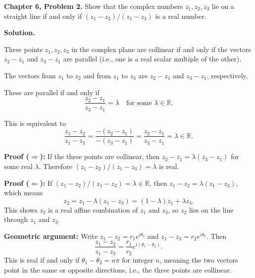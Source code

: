 \documentclass[12pt]{article}
\begin{document}
\textbf{Chapter 6, Problem 2.} Show that the complex numbers $z_1, z_2, z_3$ lie on a straight line if and only if $(z_1 - z_2)/(z_1 - z_3)$ is a real number.

\bigskip
\textbf{Solution.}

Three points $z_1, z_2, z_3$ in the complex plane are collinear if and only if the vectors $z_2 - z_1$ and $z_3 - z_1$ are parallel (i.e., one is a real scalar multiple of the other).

The vectors from $z_1$ to $z_2$ and from $z_1$ to $z_3$ are $z_2 - z_1$ and $z_3 - z_1$, respectively.

These are parallel if and only if
\[
\frac{z_2 - z_1}{z_3 - z_1} = \lambda \quad \text{for some } \lambda \in \mathbb{R}.
\]

This is equivalent to
\[
\frac{z_1 - z_2}{z_1 - z_3} = \frac{-(z_2-z_1)}{-(z_3-z_1)} = \frac{z_2-z_1}{z_3-z_1} = \lambda \in \mathbb{R}.
\]

\textbf{Proof ($\Rightarrow$):} If the three points are collinear, then $z_2 - z_1 = \lambda(z_3 - z_1)$ for some real $\lambda$. Therefore $(z_1 - z_2)/(z_1 - z_3) = \lambda$ is real.

\textbf{Proof ($\Leftarrow$):} If $(z_1-z_2)/(z_1-z_3) = \lambda \in \mathbb{R}$, then $z_1 - z_2 = \lambda(z_1-z_3)$, which means
\[
z_2 = z_1 - \lambda(z_1 - z_3) = (1-\lambda)z_1 + \lambda z_3.
\]
This shows $z_2$ is a real affine combination of $z_1$ and $z_3$, so $z_2$ lies on the line through $z_1$ and $z_3$.

\textbf{Geometric argument:} Write $z_1 - z_2 = r_1 e^{i\theta_1}$ and $z_1 - z_3 = r_2 e^{i\theta_2}$. Then
\[
\frac{z_1-z_2}{z_1-z_3} = \frac{r_1}{r_2} e^{i(\theta_1-\theta_2)}.
\]
This is real if and only if $\theta_1 - \theta_2 = n\pi$ for integer $n$, meaning the two vectors point in the same or opposite directions, i.e., the three points are collinear.
\end{document}
